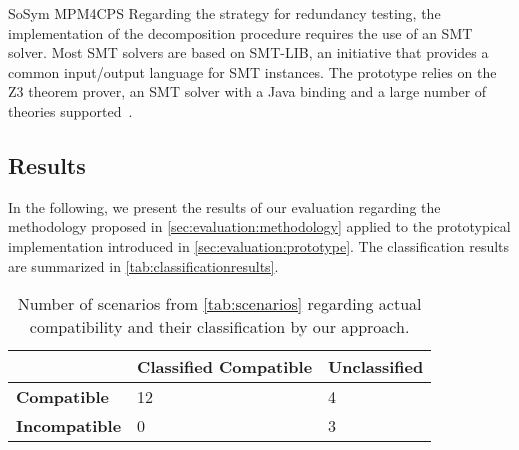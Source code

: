 \begin{copiedFrom}{SoSym MPM4CPS}
Regarding the strategy for redundancy testing, the implementation of the decomposition procedure requires the use of an SMT solver. Most SMT solvers are based on SMT-LIB, an initiative that provides a common input/output language for SMT instances. The prototype relies on the Z3 theorem prover, an SMT solver with a Java binding and a large number of theories supported~\cite{z32008}.




\subsection{Results}

In the following, we present the results of our evaluation regarding the methodology proposed in \autoref{sec:evaluation:methodology} applied to the prototypical implementation introduced in \autoref{sec:evaluation:prototype}.
The classification results are summarized in \autoref{tab:classificationresults}.

\begin{table}
    \centering
    \renewcommand{\arraystretch}{1.4}%
    \setlength\tabcolsep{4 pt}
    \begin{tabular}{L{2.2cm} C{3cm} C{2.3cm}}
        \toprule
         & \textbf{Classified Compatible} & \textbf{Unclassified} \\
         \midrule
         \textbf{Compatible} & 12 & 4\\
         \textbf{Incompatible} & 0 & 3\\
         \bottomrule
    \end{tabular}
    \caption[Correctness of compatibility classification results]{Number of scenarios from \autoref{tab:scenarios} regarding actual compatibility and their classification by our approach.}
    \label{tab:classificationresults}
\end{table}


\end{copiedFrom}
